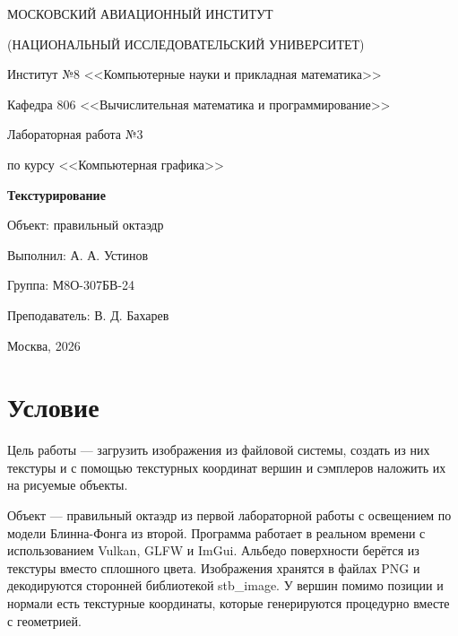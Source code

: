 \documentclass[14pt,a4paper]{extarticle}
\newcommand{\Student}{А. А. Устинов}
\newcommand{\Group}{М8О-307БВ-24}
\newcommand{\Teacher}{В. Д. Бахарев}
\newcommand{\Year}{2026}
\begin{document}
\begin{titlepage}
	\centering

	МОСКОВСКИЙ АВИАЦИОННЫЙ ИНСТИТУТ\par
	(НАЦИОНАЛЬНЫЙ ИССЛЕДОВАТЕЛЬСКИЙ УНИВЕРСИТЕТ)\par

	\vspace{6mm}

	Институт №8 <<Компьютерные науки и прикладная математика>>\par
	Кафедра 806 <<Вычислительная математика и программирование>>\par

	\vspace{6cm}

	{\Large Лабораторная работа №3\par}
	\vspace{3mm}
	{\large по курсу <<Компьютерная графика>>\par}
	\vspace{8mm}
	{\Large\bfseries Текстурирование\par}
	\vspace{3mm}
	{\large Объект: правильный октаэдр\par}

	\vspace{4cm}

	\begin{flushright}
		\begin{minipage}{0.5\textwidth}
			Выполнил: \Student\par
			Группа: \Group\par
			\vspace{6mm}
			Преподаватель: \Teacher\par
		\end{minipage}
	\end{flushright}

	\vfill
	Москва, \Year\par
\end{titlepage}

\section{Условие}

Цель работы — загрузить изображения из файловой системы, создать из них
текстуры и с помощью текстурных координат вершин и сэмплеров наложить их на
рисуемые объекты.

Объект — правильный октаэдр из первой лабораторной работы с освещением по
модели Блинна-Фонга из второй. Программа работает в реальном времени с
использованием Vulkan, GLFW и ImGui. Альбедо поверхности берётся из текстуры
вместо сплошного цвета. Изображения хранятся в файлах PNG и декодируются
сторонней библиотекой stb\_image. У вершин помимо позиции и нормали есть
текстурные координаты, которые генерируются процедурно вместе с геометрией.
\end{document}
